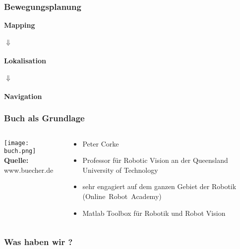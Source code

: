 \documentclass{beamer}
\begin{document}
 \begin{frame}
\frametitle{Bewegungsplanung}
\begin{center}
{\large \textbf{Mapping}} \\ 
\quad \\

	{\Huge$\Downarrow$}\\
\quad \\

{\large \textbf{Lokalisation}}\\
\quad \\
	{\Huge$\Downarrow$}\\
\quad \\
{\large \textbf{Navigation}}\\



\end{center}

\end{frame}




\begin{frame} 
  \frametitle{Buch als Grundlage} 

\begin{columns}[T]
\begin{column}[T]{5cm}
\texttt{[image: buch.png]}\\
 \footnotesize\sffamily\textbf{Quelle:} www.buecher.de

\end{column}

\begin{column}[T]{5cm}
\begin{itemize}

\item  Peter Corke
\item  Professor für Robotic Vision an der Queensland University of Technology
\item sehr engagiert  auf dem ganzen Gebiet der Robotik \mbox{(Online Robot Academy)}
\item Matlab Toolbox für Robotik und Robot Vision


\end{itemize}
\end{column}
\end{columns}
\end{frame}

\begin{frame}
\frametitle{Was haben wir ?}


\end{frame}
\end{document}
